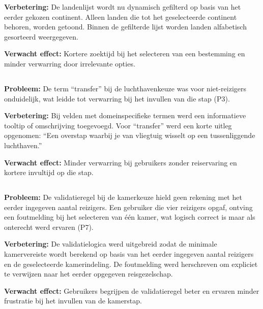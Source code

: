\textbf{Verbetering:} De landenlijst wordt nu dynamisch gefilterd op basis van het eerder gekozen continent. Alleen landen die tot het geselecteerde continent behoren, worden getoond. Binnen de gefilterde lijst worden landen alfabetisch gesorteerd weergegeven.

\textbf{Verwacht effect:} Kortere zoektijd bij het selecteren van een bestemming en minder verwarring door irrelevante opties.

\subsection{}

\textbf{Probleem:} De term ``transfer'' bij de luchthavenkeuze was voor niet-reizigers onduidelijk, wat leidde tot verwarring bij het invullen van die stap (P3).

\textbf{Verbetering:} Bij velden met domeinspecifieke termen werd een informatieve tooltip of omschrijving toegevoegd. Voor ``transfer'' werd een korte uitleg opgenomen: ``Een overstap waarbij je van vliegtuig wisselt op een tussenliggende luchthaven.''

\textbf{Verwacht effect:} Minder verwarring bij gebruikers zonder reiservaring en kortere invultijd op die stap.

\subsection{}

\textbf{Probleem:} De validatieregel bij de kamerkeuze hield geen rekening met het eerder ingegeven aantal reizigers. Een gebruiker die vier reizigers opgaf, ontving een foutmelding bij het selecteren van één kamer, wat logisch correct is maar als onterecht werd ervaren (P7).

\textbf{Verbetering:} De validatielogica werd uitgebreid zodat de minimale kamervereiste wordt berekend op basis van het eerder ingegeven aantal reizigers en de geselecteerde kamerindeling. De foutmelding werd herschreven om expliciet te verwijzen naar het eerder opgegeven reisgezelschap.

\textbf{Verwacht effect:} Gebruikers begrijpen de validatieregel beter en ervaren minder frustratie bij het invullen van de kamerstap.

\subsection{}

